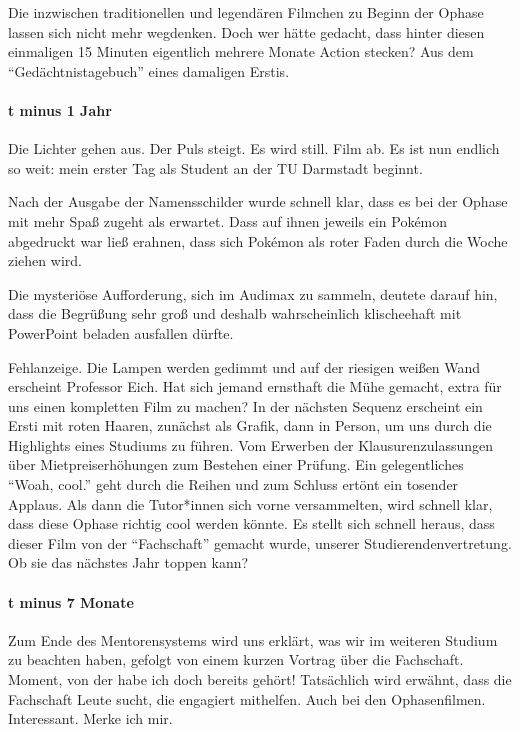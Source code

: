{Die inzwischen traditionellen und legendären Filmchen zu Beginn der Ophase
    lassen sich nicht mehr wegdenken. Doch wer hätte gedacht, dass hinter diesen
    einmaligen 15 Minuten eigentlich mehrere Monate Action stecken? Aus dem
    \enquote{Gedächtnistagebuch} eines damaligen Erstis.}
{\paragraph{t minus 1 Jahr}
    Die Lichter gehen aus. Der Puls steigt. Es wird still. Film ab. Es ist nun
    endlich so weit: mein erster Tag als Student an der TU Darmstadt beginnt.

    Nach der Ausgabe der Namensschilder wurde schnell klar, dass es bei der Ophase
    mit mehr Spaß zugeht als erwartet. Dass auf ihnen jeweils ein Pokémon
    abgedruckt war ließ erahnen, dass sich Pokémon als roter Faden durch die Woche
    ziehen wird.

    Die mysteriöse Aufforderung, sich im Audimax zu sammeln, deutete darauf hin,
    dass die Begrüßung sehr groß und deshalb wahrscheinlich klischeehaft mit
    PowerPoint beladen ausfallen dürfte.

    Fehlanzeige. Die Lampen werden gedimmt und auf der riesigen weißen Wand
    erscheint Professor Eich. Hat sich jemand ernsthaft die Mühe gemacht, extra für
    uns einen kompletten Film zu machen? In der nächsten Sequenz erscheint ein
    Ersti mit roten Haaren, zunächst als Grafik, dann in Person, um uns durch die
    Highlights eines Studiums zu führen. Vom Erwerben der Klausurenzulassungen über
    Mietpreiserhöhungen zum Bestehen einer Prüfung. Ein gelegentliches \enquote{Woah,
        cool.} geht durch die Reihen und zum Schluss ertönt ein tosender Applaus. Als
    dann die Tutor*innen sich vorne versammelten, wird schnell klar, dass diese
    Ophase richtig cool werden könnte. Es stellt sich schnell heraus, dass dieser
    Film von der \enquote{Fachschaft} gemacht wurde, unserer Studierendenvertretung. Ob sie
    das nächstes Jahr toppen kann?
    \paragraph{t minus 7 Monate}
    Zum Ende des Mentorensystems wird uns erklärt, was wir im weiteren Studium zu beachten haben,
    gefolgt von einem kurzen Vortrag über die Fachschaft. Moment, von der habe ich
    doch bereits gehört!
    Tatsächlich wird erwähnt, dass die Fachschaft Leute sucht, die engagiert
    mithelfen. Auch bei den Ophasenfilmen. Interessant. Merke ich mir.
}

